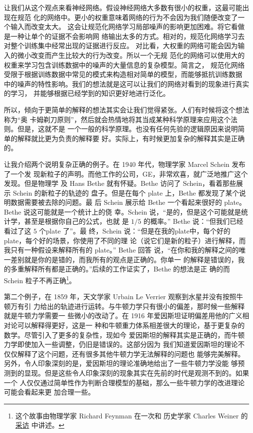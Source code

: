 让我们从这个观点来看神经网络。假设神经网络大多数有很小的权重，这最可能出现在规范
化的网络中。更小的权重意味着网络的行为不会因为我们随便改变了一个输入而改变太大。
这会让规范化网络学习局部噪声的影响更加困难。将它看做是一种让单个的证据不会影响网
络输出太多的方式。相对的，规范化网络学习去对整个训练集中经常出现的证据进行反应。
对比看，大权重的网络可能会因为输入的微小改变而产生比较大的行为改变。所以一个无规
范化的网络可以使用大的权重来学习包含训练数据中的噪声的大量信息的复杂模型。简言之，
规范化网络受限于根据训练数据中常见的模式来构造相对简单的模型，而能够抵抗训练数据
中的噪声的特性影响。我们的想法就是这可以让我们的网络对看到的现象进行真实的学习，
并能够根据已经学到的知识更好地进行泛化。

所以，倾向于更简单的解释的想法其实会让我们觉得紧张。人们有时候将这个想法称为“奥
卡姆剃刀原则”，然后就会热情地将其当成某种科学原理来应用这个法则。但是，这就不是
一个一般的科学原理。也没有任何先验的逻辑原因来说明简单的解释就比更为负责的解释要
好。实际上，有时候更加复杂的解释其实是正确的。

让我介绍两个说明复杂正确的例子。在 1940 年代，物理学家 Marcel Schein 发布了一个发
现新粒子的声明。而他工作的公司，GE，非常欢喜，就广泛地推广这个发现。但是物理学
及 Hans Bethe 就有怀疑。Bethe 访问了 Schein，看着那些展示 Schein 的新粒子的轨迹的
盘子。但是在每个 plate 上，Bethe 都发现了某个说明数据需要被去除的问题。最
后 Schein 展示给 Bethe 一个看起来很好的 plate。Bethe 说这可能就是一个统计上的侥
幸。Schein 说，“是的，但是这个可能就是统计学，甚至是根据你自己的公式，也就
是 $1/5$ 的概率。” Bethe 说：“但我们已经看过了这 $5$ 个plate 了”。最
终，Schein 说：“但是在我的plate中，每个好的plate，每个好的场景，你使用了不同的理
论（说它们是新的粒子）进行解释，而我只有一种假设来解释所有的 plate。” Bethe 回答
说，“在你和我的解释之间的唯一差别就是你的是错的，而我所有的观点是正确的。你单一
的解释是错误的，我的多重解释所有都是正确的。”后续的工作证实了，Bethe 的想法是正
确的而 Schein 粒子不再正确\footnote{这个故事由物理学家 Richard Feynman 在一次和
历史学家 Charles Weiner 的%
  \href{https://www.aip.org/history-programs/niels-bohr-library/oral-histories/5020-4}{采访}%
  中讲述。}。

第二个例子，在 1859 年，天文学家 Urbain Le Verrier 观察到水星并没有按照牛顿万有引
力给出的轨迹进行运转。与牛顿力学只有很小的偏差，那时候一些解释就是牛顿力学需要一
些微小的改动了。在 1916 年爱因斯坦证明偏差用他的广义相对论可以解释得更好，这是一
种和牛顿重力体系相差很大的理论，基于更复杂的数学。尽管引入了更多的复杂性，现如今
爱因斯坦的解释其实是正确的，而牛顿力学即使加入一些调整，仍旧是错误的。这部分因为
我们知道爱因斯坦的理论不仅仅解释了这个问题，还有很多其他牛顿力学无法解释的问题也
能够完美解释。另外，令人印象深刻的是，爱因斯坦的理论准确地给出了一些牛顿力学没能
够预测到的显现。但是这些令人印象深刻的现象其实在先前的时代是观测不到的。如果一个
人仅仅通过简单性作为判断合理模型的基础，那么一些牛顿力学的改进理论可能会看起来更
加合理一些。

